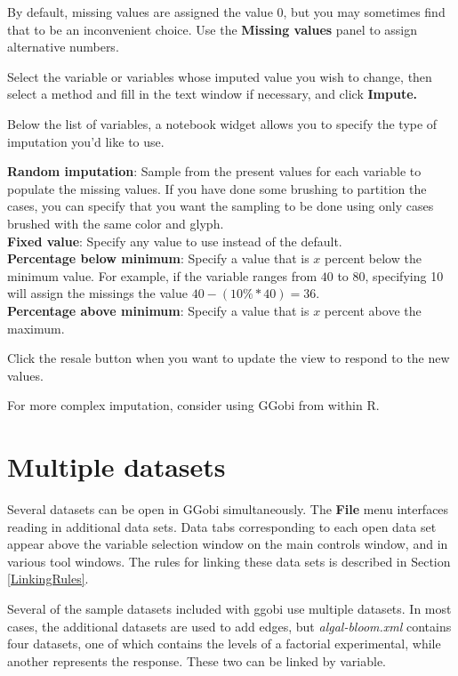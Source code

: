 \documentclass[11pt]{article}
\def\Widget#1{\textbf{#1}}
\def\File#1{\textsl{#1}}
\begin{document}
{%
By default, missing values are assigned the value $0$, but you
may sometimes find that to be an inconvenient choice.  Use the
\Widget{Missing values} panel to assign alternative numbers.

Select the variable or variables whose imputed value you
wish to change, then select a method and fill in the text window
if necessary, and click \Widget{Impute.}

Below the list of variables, a notebook widget allows you to specify
the type of imputation you'd like to use.

\Widget{Random imputation}: Sample from the present values for each variable
  to populate the missing values.  If you have done some brushing to
  partition the cases, you can specify that you want the sampling to be
  done using only cases brushed with the same color and glyph.
\\\Widget{Fixed value}: Specify any value to use instead of the default.
\\\Widget{Percentage below minimum}: Specify a value that is $x$ percent
  below the minimum value.  For example, if the variable ranges from
 $40$ to $80$, specifying 10 will assign the missings the value $40 - (10\%
 * 40) = 36$.
\\\Widget{Percentage above minimum}: Specify a value that is $x$ percent
above the maximum.

Click the resale button when you want to update the view to
respond to the new values.

For more complex imputation, consider using GGobi from within R.

%
%

\section{Multiple datasets}

Several datasets can be open in GGobi simultaneously. The \Widget{File}
menu interfaces reading in additional data sets. Data tabs corresponding
to each open data set appear above the variable selection window on
the main controls window, and in various tool windows. The rules for
linking these data sets is described in Section \ref{LinkingRules}.

Several of the sample datasets included with ggobi use multiple
datasets.  In most cases, the additional datasets are used to add
edges, but \File{algal-bloom.xml} contains four datasets, one of which
contains the levels of a factorial experimental, while another
represents the response.  These two can be linked by variable.

}
\end{document}

